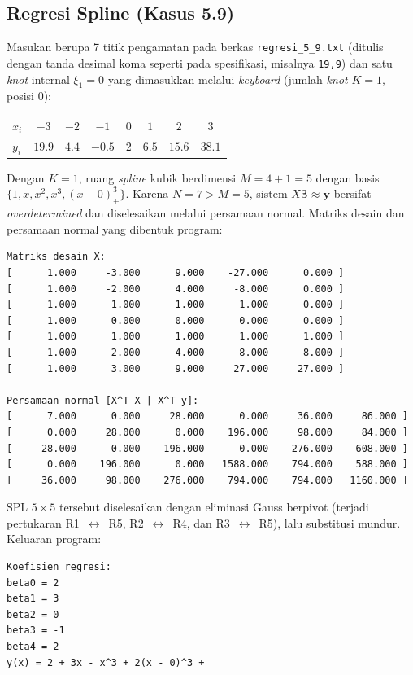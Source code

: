 \documentclass[12pt,a4paper]{article}
\begin{document}
\subsection{Regresi Spline (Kasus 5.9)}
Masukan berupa 7 titik pengamatan pada berkas \texttt{regresi\_5\_9.txt} (ditulis dengan tanda desimal koma seperti pada spesifikasi, misalnya \texttt{19,9}) dan satu \textit{knot} internal $\xi_1=0$ yang dimasukkan melalui \textit{keyboard} (jumlah \textit{knot} $K=1$, posisi $0$):
\begin{center}\small
\begin{tabular}{@{}lccccccc@{}}
\toprule
$x_i$ & $-3$ & $-2$ & $-1$ & $0$ & $1$ & $2$ & $3$\\
$y_i$ & $19.9$ & $4.4$ & $-0.5$ & $2$ & $6.5$ & $15.6$ & $38.1$\\
\bottomrule
\end{tabular}
\end{center}
Dengan $K=1$, ruang \textit{spline} kubik berdimensi $M=4+1=5$ dengan basis $\{1,x,x^2,x^3,(x-0)_+^3\}$. Karena $N=7>M=5$, sistem $X\boldsymbol\beta\approx\mathbf{y}$ bersifat \textit{overdetermined} dan diselesaikan melalui persamaan normal. Matriks desain dan persamaan normal yang dibentuk program:
\begin{lstlisting}
Matriks desain X:
[      1.000     -3.000      9.000    -27.000      0.000 ]
[      1.000     -2.000      4.000     -8.000      0.000 ]
[      1.000     -1.000      1.000     -1.000      0.000 ]
[      1.000      0.000      0.000      0.000      0.000 ]
[      1.000      1.000      1.000      1.000      1.000 ]
[      1.000      2.000      4.000      8.000      8.000 ]
[      1.000      3.000      9.000     27.000     27.000 ]

Persamaan normal [X^T X | X^T y]:
[      7.000      0.000     28.000      0.000     36.000     86.000 ]
[      0.000     28.000      0.000    196.000     98.000     84.000 ]
[     28.000      0.000    196.000      0.000    276.000    608.000 ]
[      0.000    196.000      0.000   1588.000    794.000    588.000 ]
[     36.000     98.000    276.000    794.000    794.000   1160.000 ]
\end{lstlisting}
SPL $5\times5$ tersebut diselesaikan dengan eliminasi Gauss berpivot (terjadi pertukaran R1~$\leftrightarrow$~R5, R2~$\leftrightarrow$~R4, dan R3~$\leftrightarrow$~R5), lalu substitusi mundur. Keluaran program:
\begin{lstlisting}
Koefisien regresi:
beta0 = 2
beta1 = 3
beta2 = 0
beta3 = -1
beta4 = 2
y(x) = 2 + 3x - x^3 + 2(x - 0)^3_+
\end{lstlisting}
\end{document}
